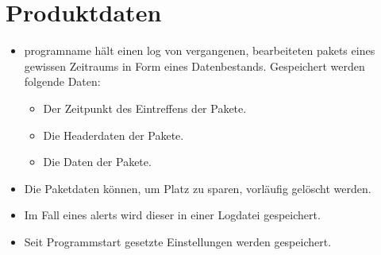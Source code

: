 \chapter{Produktdaten}


\begin{itemize}
  \item \gls{programname} hält einen \gls{log} von vergangenen, bearbeiteten \glspl{paket} eines gewissen Zeitraums in Form eines Datenbestands. Gespeichert werden folgende Daten:
  
  \begin{itemize}
    \item Der Zeitpunkt des Eintreffens der Pakete.
    \item Die Headerdaten der Pakete.
    \item Die Daten der Pakete.
    \end{itemize}
  \item Die Paketdaten können, um Platz zu sparen, vorläufig gelöscht werden.
  \item Im Fall eines \glspl{alert} wird dieser in einer Logdatei gespeichert.
  \item Seit Programmstart gesetzte Einstellungen werden gespeichert.
\end{itemize}

